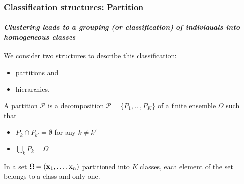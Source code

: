 \documentclass{beamer}\usepackage[]{graphicx}\usepackage[]{color}
\begin{document}
\begin{frame}
  \frametitle{Classification structures: Partition}

  \paragraph{\it Clustering leads to a grouping (or classification) of individuals into homogeneous classes} 
  \bigskip
  
  We consider two structures to describe this classification: 
  \begin{itemize}
    \item \alert{partitions} and
    \item \alert{hierarchies}.
  \end{itemize}

  \vfill

  \begin{definition}[Partition]
    A partition $\mathcal{P}$ is a decomposition $\mathcal{P} = \{P_1,\dots,P_K\}$ of a finite ensemble $\Omega$ such that
    \begin{itemize}
      \item $P_k \cap P_{k'} = \emptyset$ for any $k\neq k'$
      \item $\bigcup_{k} P_k = \Omega$
    \end{itemize}
    In a set $\Omega = (\mathbf{x}_1, \dots, \mathbf{x}_n)$ partitioned into $K$ classes, each element of the set belongs to a
class and only one.
  \end{definition}

\end{frame}
\end{document}
